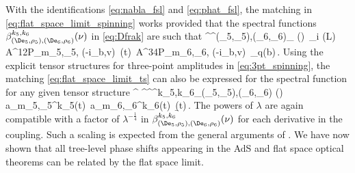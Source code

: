 With the identifications \eqref{eq:nabla_fsl} and \eqref{eq:phat_fsl}, the matching in \eqref{eq:flat_space_limit_spinning} works provided that the spectral functions $\beta^{k_5,k_6}_{(\De_5,\rho_5),(\De_6,\rho_6)} (\nu)$ in \eqref{eq:Dfrak} are such that
	\beq
		\lambda^{}^{(\De_5,\rho_5),(\De_6,\rho_6)}_{ } (\nu)\, \Omega_{i \nu} (L) \, \to\, 
		A^{12P}_{m_5,\rho_5,} (-i\partial_{b},v) \,\beta(t)\, A^{34P}_{m_6,\rho_6,} (-i\partial_{b},v)
		\,\omega_{q}(b)\,.
\label{eq:flat_space_limit_ts}
	\eeq
Using the explicit tensor structures for three-point amplitudes in \eqref{eq:3pt_spinning}, the matching \eqref{eq:flat_space_limit_ts} can also be expressed for the spectral function for any given tensor structure
\beq
 \lambda^{} \lambda^{}\lambda^{}\beta^{k_5,k_6}_{(\De_5,\rho_5),(\De_6,\rho_6)} (\nu)
\ \to\ 
\,
a_{m_5,\rho_5}^{k_5}(t) \,a_{m_6,\rho_6}^{k_6}(t) \,\b(t)\,.
\label{eq:flat_space_limit_beta_spinning}
\eeq
The powers of $\lambda$ are again compatible with a factor of $\lambda^{-\frac{1}{4}}$ in $\beta^{k_5,k_6}_{(\De_5,\rho_5),(\De_6,\rho_6)} (\nu)$ for each derivative in the coupling.
Such a scaling is expected from the general arguments of \cite{Costa:2017twz,Meltzer:2017rtf}.
We have now shown that all tree-level phase shifts appearing in the AdS and flat space optical theorems can be related by the flat space limit. 

